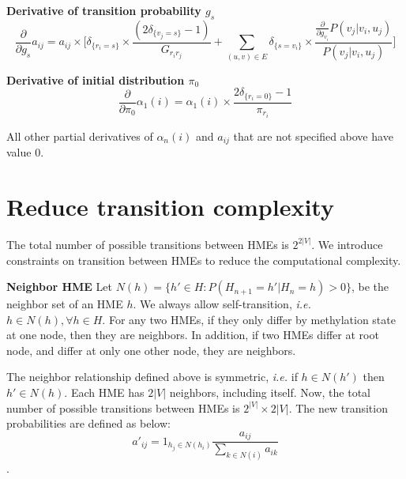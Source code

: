 \documentclass[11pt]{article}
\begin{document}
\noindent\textbf{Derivative of transition probability $g_s$}
\begin{equation*}
\frac{\partial}{\partial g_s}a_{ij} =
a_{ij} \times\big[ \delta_{\{r_i=s\}}\times\frac{(2\delta_{\{v_j=s\}}-1)}{G_{r_ir_j}} + \sum_{(u,v)\in E} \delta_{\{s=v_i\}}\times\frac{\frac{\partial}{\partial g_{v_i}}P(v_j|v_i,u_j)}{P(v_j|v_i,u_j)} \big]
\end{equation*}

\noindent\textbf{Derivative of initial distribution $\pi_0$}
\begin{equation*}
\frac{\partial}{\partial \pi_0}\alpha_1(i) = \alpha_1(i)\times\frac{2\delta_{\{r_i=0\}}-1}{\pi_{r_i}}
\end{equation*}

All other partial derivatives of $\alpha_n(i)$ and $a_{ij}$ that are
not specified above have value 0.

\section{Reduce transition complexity}
The total number of possible transitions between HMEs is $2^{2|V|}$. We
introduce constraints on transition between HMEs to reduce the
computational complexity.

\textbf{Neighbor HME} Let $N(h)=\{h'\in H: P(H_{n+1}=h'|H_n=h) > 0\}$,
be the neighbor set of an HME $h$. We always allow self-transition,
\textit{i.e.} $h\in N(h), \forall h\in H$. For any two HMEs, if they only
differ by methylation state at one node, then they are neighbors. In
addition, if two HMEs differ at root node, and differ at only one
other node, they are neighbors.

The neighbor relationship defined above is symmetric, \textit{i.e.} if
$h\in N(h')$ then $h'\in N(h)$. Each HME has $2|V|$ neighbors,
including itself. Now, the total number of possible transitions between
HMEs is $2^{|V|}\times 2|V|$. The new transition probabilities are defined
as below:
$$a'_{ij} =1_{h_j\in N(h_i)} \frac{a_{ij}}{\sum_{k\in N(i)} a_{ik}}$$.



\end{document}
